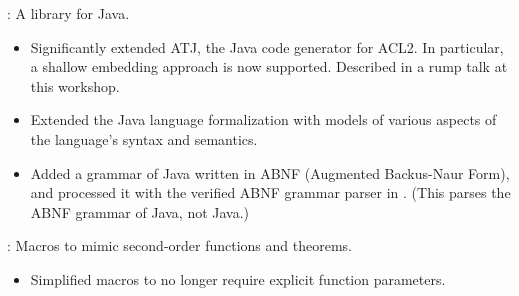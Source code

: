 \begin{frame}

\implibtitle

:
A library for Java.
\begin{itemize}
\item
Significantly extended ATJ, the Java code generator for ACL2.
In particular, a shallow embedding approach is now supported.
Described in a rump talk at this workshop.
\item
Extended the Java language formalization with models of
various aspects of the language's syntax and semantics.
\item
Added a grammar of Java written in ABNF (Augmented Backus-Naur Form),
and processed it with the verified ABNF grammar parser in .
(This parses the ABNF grammar of Java, not Java.)
\end{itemize}

\end{frame}


\begin{frame}

\implibtitle

:
Macros to mimic second-order functions and theorems.
\begin{itemize}
\item
Simplified macros to no longer require explicit function parameters.
\end{itemize}

\end{frame}


